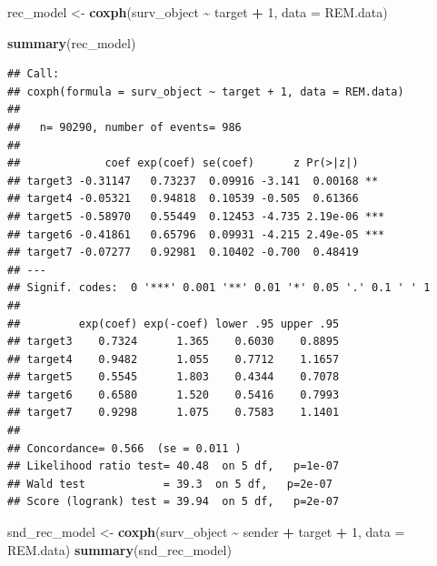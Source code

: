 \documentclass[
]{article}
\newenvironment{Shaded}{\begin{snugshade}}{\end{snugshade}}
\newcommand{\AttributeTok}[1]{\textcolor[rgb]{0.13,0.29,0.53}{#1}}
\newcommand{\DecValTok}[1]{\textcolor[rgb]{0.00,0.00,0.81}{#1}}
\newcommand{\FunctionTok}[1]{\textcolor[rgb]{0.13,0.29,0.53}{\textbf{#1}}}
\newcommand{\NormalTok}[1]{#1}
\newcommand{\OtherTok}[1]{\textcolor[rgb]{0.56,0.35,0.01}{#1}}
\newcommand{\SpecialCharTok}[1]{\textcolor[rgb]{0.81,0.36,0.00}{\textbf{#1}}}
\begin{document}
\begin{Shaded}
\begin{Highlighting}[]
\NormalTok{rec\_model }\OtherTok{\textless{}{-}} \FunctionTok{coxph}\NormalTok{(surv\_object }\SpecialCharTok{\textasciitilde{}}\NormalTok{ target }\SpecialCharTok{+} \DecValTok{1}\NormalTok{, }\AttributeTok{data =}\NormalTok{ REM.data)}


\FunctionTok{summary}\NormalTok{(rec\_model)}
\end{Highlighting}
\end{Shaded}

\begin{verbatim}
## Call:
## coxph(formula = surv_object ~ target + 1, data = REM.data)
## 
##   n= 90290, number of events= 986 
## 
##             coef exp(coef) se(coef)      z Pr(>|z|)    
## target3 -0.31147   0.73237  0.09916 -3.141  0.00168 ** 
## target4 -0.05321   0.94818  0.10539 -0.505  0.61366    
## target5 -0.58970   0.55449  0.12453 -4.735 2.19e-06 ***
## target6 -0.41861   0.65796  0.09931 -4.215 2.49e-05 ***
## target7 -0.07277   0.92981  0.10402 -0.700  0.48419    
## ---
## Signif. codes:  0 '***' 0.001 '**' 0.01 '*' 0.05 '.' 0.1 ' ' 1
## 
##         exp(coef) exp(-coef) lower .95 upper .95
## target3    0.7324      1.365    0.6030    0.8895
## target4    0.9482      1.055    0.7712    1.1657
## target5    0.5545      1.803    0.4344    0.7078
## target6    0.6580      1.520    0.5416    0.7993
## target7    0.9298      1.075    0.7583    1.1401
## 
## Concordance= 0.566  (se = 0.011 )
## Likelihood ratio test= 40.48  on 5 df,   p=1e-07
## Wald test            = 39.3  on 5 df,   p=2e-07
## Score (logrank) test = 39.94  on 5 df,   p=2e-07
\end{verbatim}

\begin{Shaded}
\begin{Highlighting}[]
\NormalTok{snd\_rec\_model }\OtherTok{\textless{}{-}} \FunctionTok{coxph}\NormalTok{(surv\_object }\SpecialCharTok{\textasciitilde{}}\NormalTok{ sender }\SpecialCharTok{+}\NormalTok{ target }\SpecialCharTok{+} \DecValTok{1}\NormalTok{, }\AttributeTok{data =}\NormalTok{ REM.data)}
\FunctionTok{summary}\NormalTok{(snd\_rec\_model)}
\end{Highlighting}
\end{Shaded}
\end{document}
